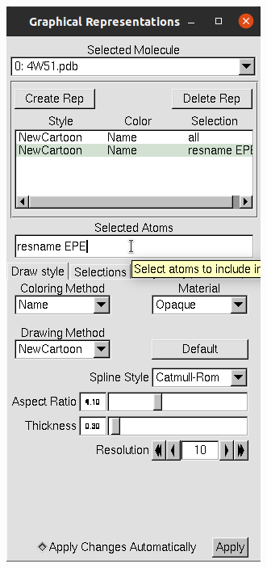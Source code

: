 \begin{figure}[H]
\begin{minipage}{0.5\textwidth}
            \includegraphics[height=0.4\textheight]{Graphics/ScreenShots/SelectedAtoms.png}
            \label{fig:SelectedAtoms}
        \end{minipage}
    \end{figure}

